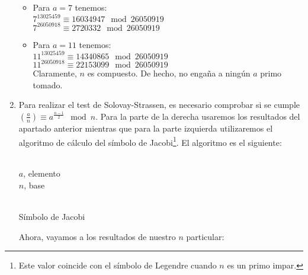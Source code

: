 \begin{enumerate}
\begin{itemize}
			\item Para $a = 7$ tenemos:\\
				$7^{13025459} \equiv 16034947 \mod{26050919}$\\
				$7^{26050918} \equiv 2720332 \mod{26050919}$\\
				
			\item Para $a = 11$ tenemos:\\
				$11^{13025459} \equiv 14340865 \mod{26050919}$\\
				$11^{26050918} \equiv 22153099 \mod{26050919}$\\
				
			Claramente, $n$ es compuesto. De hecho, no engaña a ningún $a$ primo tomado.
		\end{itemize}
		
		\item Para realizar el test de Solovay-Strassen, es necesario comprobar si se cumple $\displaystyle \left(
		\frac{a}{n} \right) \equiv a^{\frac{n-1}{2}} \mod{n}$. Para la parte de la derecha usaremos los resultados del
		apartado anterior mientras que para la parte izquierda utilizaremos el algoritmo de cálculo del símbolo
		de Jacobi\footnote{Este valor coincide con el símbolo de Legendre cuando $n$ es un primo impar.}. El
		algoritmo es el siguiente:
		\begin{algorithm}[H]
			\begin{algorithmic}[1]
				\REQUIRE \ \\
					\texttt{$a$}, elemento \\
					\texttt{$n$}, base \\ \
						\ENDIF
					\ENDWHILE
					\ENDIF
				\ENDWHILE
				\ELSE
				\ENDIF
			\end{algorithmic}
			\caption{Símbolo de Jacobi}
			\label{Jac-symbol}
		\end{algorithm}
		
		Ahora, vayamos a los resultados de nuestro $n$ particular:
		

\end{enumerate}
